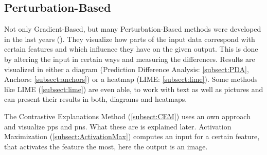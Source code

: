 \subsection{Perturbation-Based}
Not only Gradient-Based, but many Perturbation-Based methods were developed in the last years (\cite{AmitDhurandhar.2018,Ribeiro.2018,Luss.,Kim.2018,Zintgraf.2017}). They visualize how parts of the input data correspond with certain features and which influence they have on the given output. This is done by altering the input in certain ways and measuring the differences. Results are visualized in either a diagram (Prediction Difference Analysis: \cref{subsect:PDA}, Anchors: \cref{subsect:anchors}) or a heatmap (LIME: \cref{subsect:lime}). Some methods like LIME (\cref{subsect:lime}) are even able, to work with text as well as pictures and can present their results in both, diagrams and heatmaps. 
\par
The Contrastive Explanations Method (\cref{subsect:CEM}) uses an own approach and visualize \glspl{pp} and \glspl{pn}. What these are is explained later. Activation Maximization (\cref{subsect:ActivationMax}) computes an input for a certain feature, that activates the feature the most, here the output is an image.